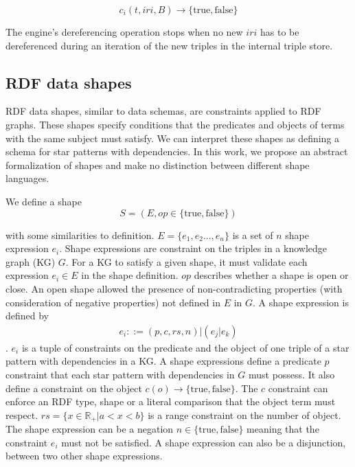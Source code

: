 \begin{equation}\label{eq:reachabilityCriteria}
c_i(t, iri, B) \rightarrow \{\mathrm{true}, \mathrm{false}\}
\end{equation}

The engine's dereferencing operation stops when no new $iri$ has to be dereferenced during an iteration of the new triples in the internal triple store.

\subsection{RDF data shapes}
RDF data shapes, similar to data schemas, are constraints applied to RDF graphs.
These shapes specify conditions that the predicates and objects of terms with the same subject must satisfy.
 We can interpret these shapes as defining a schema for star patterns with dependencies. 
 In this work, we propose an abstract formalization of shapes and make no distinction between different shape languages.~

We define a shape
\begin{equation}
S = (E, op \in \{\mathrm{true},\mathrm{false}\})
\end{equation}

with some similarities to \citeauthor{Abbas2018} definition.
$E = \{e_1, e_2 ..., e_{n}\}$ is a set of $n$ shape expression $e_i$.
Shape expressions are constraint on the triples in a knowledge graph (KG) $G$.
For a KG to satisfy a given shape, it must validate each expression $e_i \in E$ in the shape definition.
$op$ describes whether a shape is open or close.
An open shape allowed the presence of non-contradicting properties (with consideration of negative properties) not defined in $E$ in $G$.
A shape expression is defined by
\begin{align}
 e_i ::= (p, c, rs, n) | (e_j|e_k)
\end{align}
.
$e_i$ is a tuple of constraints on the predicate and the object of one triple of a star pattern with dependencies in a KG. 
A shape expressions define a predicate $p$ constraint that each star pattern with dependencies in $G$ must possess.
It also define a constraint on the object $c(o) \rightarrow \{\mathrm{true}, \mathrm{false}\}$.
The $c$ constraint can enforce an RDF type, shape or a literal comparison that the object term must respect.
$rs = \{x \in \mathbb{R}_+ | a < x < b \}$ is a range constraint on the number of object.
The shape expression can be a negation $n \in \{\mathrm{true}, \mathrm{false}\}$ meaning that the constraint $e_i$ must not be satisfied.
A shape expression can also be a disjunction, between two other shape expressions.

